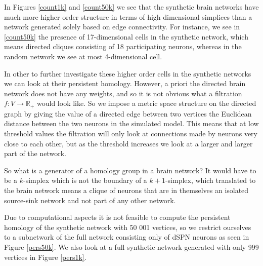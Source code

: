 In Figures \ref{count1k} and \ref{count50k} we see that the synthetic brain networks have much more higher order structure in terms of high dimensional simplices than a network generated solely based on edge connectivity. For instance, we see in \ref{count50k} the presence of 17-dimensional cells in the synthetic network, which means directed cliques consisting of 18 participating neurons, whereas in the random network we see at most 4-dimensional cell.

In other to further investigate these higher order cells in the synthetic networks we can look at their persistent homology. However, a priori the directed brain network does not have any weights, and so it is not obvious what a filtration $f: V \to \mathbb{R_{+}}$ would look like. So we impose a metric space structure on the directed graph by giving the value of a directed edge between two vertices the Euclidean distance between the two neurons in the simulated model. This means that at low threshold values the filtration will only look at connections made by neurons very close to each other, but as the threshold increases we look at a larger and larger part of the network.

So what is a generator of a homology group in a brain network? It would have to be a $k$-simplex which is not the boundary of a $k+1$-simplex, which translated to the brain network means a clique of neurons that are in themselves an isolated source-sink network and not part of any other network.

Due to computational aspects it is not feasible to compute the persistent homology of the synthetic network with 50 001 vertices, so we restrict ourselves to a subnetwork of the full network consisting only of dSPN neurons as seen in Figure \ref{pers50k}. We also look at a full synthetic network generated with only 999 vertices in Figure \ref{pers1k}.

